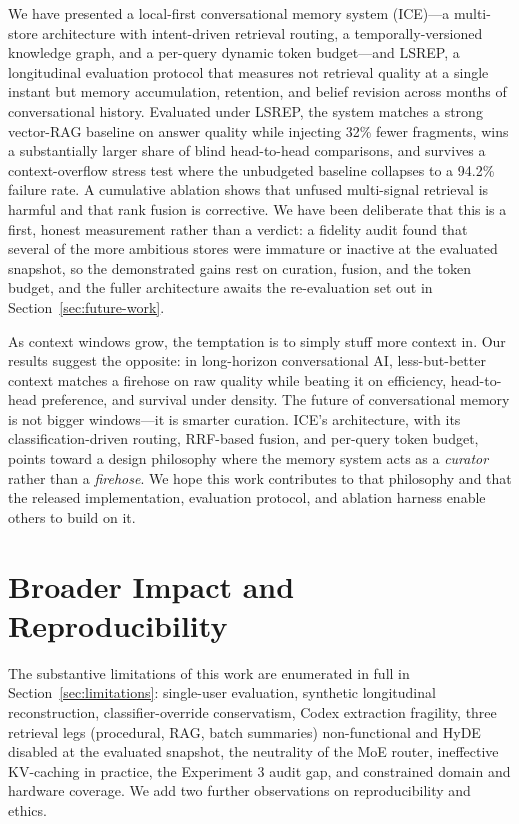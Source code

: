 \documentclass[10pt]{article}
\begin{document}
We have presented a local-first conversational memory system (ICE)---a multi-store architecture with intent-driven retrieval routing, a temporally-versioned knowledge graph, and a per-query dynamic token budget---and LSREP, a longitudinal evaluation protocol that measures not retrieval quality at a single instant but memory accumulation, retention, and belief revision across months of conversational history. Evaluated under LSREP, the system matches a strong vector-RAG baseline on answer quality while injecting 32\% fewer fragments, wins a substantially larger share of blind head-to-head comparisons, and survives a context-overflow stress test where the unbudgeted baseline collapses to a 94.2\% failure rate. A cumulative ablation shows that unfused multi-signal retrieval is harmful and that rank fusion is corrective. We have been deliberate that this is a first, honest measurement rather than a verdict: a fidelity audit found that several of the more ambitious stores were immature or inactive at the evaluated snapshot, so the demonstrated gains rest on curation, fusion, and the token budget, and the fuller architecture awaits the re-evaluation set out in Section~\ref{sec:future-work}.

As context windows grow, the temptation is to simply stuff more context in. Our results suggest the opposite: in long-horizon conversational AI, less-but-better context matches a firehose on raw quality while beating it on efficiency, head-to-head preference, and survival under density. The future of conversational memory is not bigger windows---it is smarter curation. ICE's architecture, with its classification-driven routing, RRF-based fusion, and per-query token budget, points toward a design philosophy where the memory system acts as a \emph{curator} rather than a \emph{firehose}. We hope this work contributes to that philosophy and that the released implementation, evaluation protocol, and ablation harness enable others to build on it.

\section*{Broader Impact and Reproducibility}

The substantive limitations of this work are enumerated in full in Section~\ref{sec:limitations}: single-user evaluation, synthetic longitudinal reconstruction, classifier-override conservatism, Codex extraction fragility, three retrieval legs (procedural, RAG, batch summaries) non-functional and HyDE disabled at the evaluated snapshot, the neutrality of the MoE router, ineffective KV-caching in practice, the Experiment 3 audit gap, and constrained domain and hardware coverage. We add two further observations on reproducibility and ethics.
\end{document}
